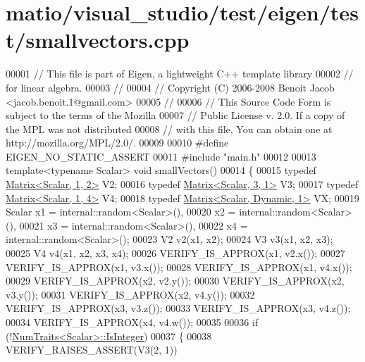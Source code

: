 \hypertarget{matio_2visual__studio_2test_2eigen_2test_2smallvectors_8cpp_source}{}\section{matio/visual\+\_\+studio/test/eigen/test/smallvectors.cpp}
\label{matio_2visual__studio_2test_2eigen_2test_2smallvectors_8cpp_source}

\begin{DoxyCode}
00001 \textcolor{comment}{// This file is part of Eigen, a lightweight C++ template library}
00002 \textcolor{comment}{// for linear algebra.}
00003 \textcolor{comment}{//}
00004 \textcolor{comment}{// Copyright (C) 2006-2008 Benoit Jacob <jacob.benoit.1@gmail.com>}
00005 \textcolor{comment}{//}
00006 \textcolor{comment}{// This Source Code Form is subject to the terms of the Mozilla}
00007 \textcolor{comment}{// Public License v. 2.0. If a copy of the MPL was not distributed}
00008 \textcolor{comment}{// with this file, You can obtain one at http://mozilla.org/MPL/2.0/.}
00009 
00010 \textcolor{preprocessor}{#define EIGEN\_NO\_STATIC\_ASSERT}
00011 \textcolor{preprocessor}{#include "main.h"}
00012 
00013 \textcolor{keyword}{template}<\textcolor{keyword}{typename} Scalar> \textcolor{keywordtype}{void} smallVectors()
00014 \{
00015   \textcolor{keyword}{typedef} \hyperlink{group___core___module_class_eigen_1_1_matrix}{Matrix<Scalar, 1, 2>} V2;
00016   \textcolor{keyword}{typedef} \hyperlink{group___core___module}{Matrix<Scalar, 3, 1>} V3;
00017   \textcolor{keyword}{typedef} \hyperlink{group___core___module_class_eigen_1_1_matrix}{Matrix<Scalar, 1, 4>} V4;
00018   \textcolor{keyword}{typedef} \hyperlink{group___core___module}{Matrix<Scalar, Dynamic, 1>} VX;
00019   Scalar x1 = internal::random<Scalar>(),
00020          x2 = internal::random<Scalar>(),
00021          x3 = internal::random<Scalar>(),
00022          x4 = internal::random<Scalar>();
00023   V2 v2(x1, x2);
00024   V3 v3(x1, x2, x3);
00025   V4 v4(x1, x2, x3, x4);
00026   VERIFY\_IS\_APPROX(x1, v2.x());
00027   VERIFY\_IS\_APPROX(x1, v3.x());
00028   VERIFY\_IS\_APPROX(x1, v4.x());
00029   VERIFY\_IS\_APPROX(x2, v2.y());
00030   VERIFY\_IS\_APPROX(x2, v3.y());
00031   VERIFY\_IS\_APPROX(x2, v4.y());
00032   VERIFY\_IS\_APPROX(x3, v3.z());
00033   VERIFY\_IS\_APPROX(x3, v4.z());
00034   VERIFY\_IS\_APPROX(x4, v4.w());
00035 
00036   \textcolor{keywordflow}{if} (!\hyperlink{group___core___module_struct_eigen_1_1_num_traits}{NumTraits<Scalar>::IsInteger})
00037   \{
00038     VERIFY\_RAISES\_ASSERT(V3(2, 1))

\end{DoxyCode}
